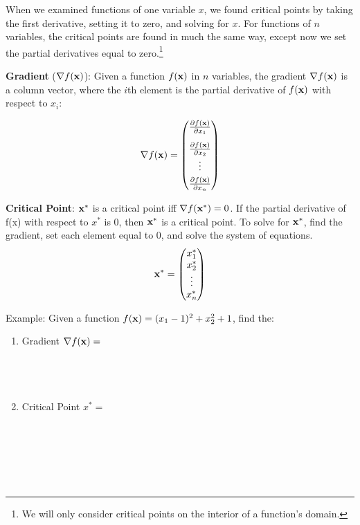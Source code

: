 \documentclass[]{book}
\let\rmarkdownfootnote\footnote%
\def\footnote{\protect\rmarkdownfootnote}
\newcommand{\fx}{f({\bf x})}
\theoremstyle{definition}
\theoremstyle{definition}
\theoremstyle{definition}
\theoremstyle{remark}
\begin{document}
When we examined functions of one variable \(x\), we found critical
points by taking the first derivative, setting it to zero, and solving
for \(x\). For functions of \(n\) variables, the critical points are
found in much the same way, except now we set the partial derivatives
equal to zero.\footnote{We
will only consider critical points on the interior of a function's
domain.}

\textbf{Gradient} (\(\nabla \fx\)): Given a function \(f({\bf x})\) in
\(n\) variables, the gradient \(\nabla \fx\) is a column vector, where
the \(i\)th element is the partial derivative of \(f({\bf x})\) with
respect to \(x_i\):

\[\nabla \fx = \begin{pmatrix}
\frac{\partial \fx}{\partial x_1}\\[9pt] \frac{\partial \fx}{\partial x_2}\\
  \vdots \\[3pt] \frac{\partial \fx}{\partial x_n} \end{pmatrix}\]

\textbf{Critical Point}: \({\bf x}^*\) is a critical point iff
\(\nabla f({\bf x}^*)=0\). If the partial derivative of f(x) with
respect to \(x^*\) is 0, then \({\bf x}^*\) is a critical point. To
solve for \({\bf x}^*\), find the gradient, set each element equal to 0,
and solve the system of equations.
\[{\bf x}^* = \begin{pmatrix} x_1^*\\x_2^*\\ \vdots \\ x_n^*\end{pmatrix}\]

Example: Given a function \(\fx=(x_1-1)^2+x_2^2+1\), find the:

\begin{enumerate}
  \item Gradient $\nabla \fx =$ 
  $$\phantom{\begin{pmatrix}
    \frac{\partial \fx}{\partial x_1}\\[9pt] \frac{\partial \fx}
    {\partial x_2} \end{pmatrix}
    = \begin{pmatrix}
    2(x_1-1)\\ 2x_2 \end{pmatrix}}$$

  \item Critical Point $x^* =$
  $$\phantom{\frac{\partial \fx}{\partial x_1} = 2(x_1-1) = 0 
  \Rightarrow x_1^* = 1}$$
  $$\phantom{\frac{\partial \fx}{\partial x_2} = 2x_2 = 0 \Rightarrow 
  x_2^* = 0}$$
  $$\phantom{{\bf x}^* = (1,0)}$$
  \end{enumerate}
\end{document}
